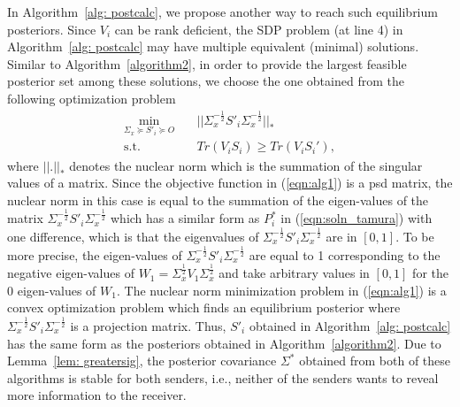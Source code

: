 \documentclass[12pt,journal,onecolumn]{IEEEtran}
\begin{document}
In Algorithm~\ref{alg: postcalc}, we propose another way to reach such equilibrium posteriors. %
Since $V_i$ can be rank deficient, the SDP problem (at line 4) in Algorithm~\ref{alg: postcalc} may have multiple equivalent (minimal) solutions.
Similar to Algorithm~\ref{algorithm2}, in order to provide the largest feasible posterior set 
among these solutions, we choose the one obtained from the following optimization problem   
\begin{align}\label{eqn:alg1}
\min_{\Sigma_x\succeq S'_{i}\succeq O} & \quad  ||\Sigma_x^{-\frac{1}{2}}S'_{i}\Sigma_x^{-\frac{1}{2}}||_* \nonumber\\
\textrm{s.t.} & \quad 
Tr(V_iS_i)\geq Tr(V_iS_i'),
\end{align}
where $||.||_*$ denotes the nuclear norm which is the summation of the singular values of a matrix. Since the objective function in (\ref{eqn:alg1}) is a psd matrix, the nuclear norm in this case is equal to the summation of the eigen-values of the matrix $ \Sigma_x^{-\frac{1}{2}}S'_{i}\Sigma_x^{-\frac{1}{2}}$ which has a similar form as $P_i^*$ in (\ref{eqn:soln_tamura}) with one difference, which is that the eigenvalues of $\Sigma_x^{-\frac{1}{2}}S'_{i}\Sigma_x^{-\frac{1}{2}}$ are in $[0,1]$. To be more precise, the eigen-values of $\Sigma_x^{-\frac{1}{2}}S'_{i}\Sigma_x^{-\frac{1}{2}}$ are equal to 1 corresponding to the negative eigen-values of $W_1=\Sigma_x^{\frac{1}{2}}V_{1}\Sigma_x^{\frac{1}{2}}$ and take arbitrary values in $[0,1]$ for the 0 eigen-values of $W_1$. The nuclear norm minimization problem in (\ref{eqn:alg1}) is a convex optimization problem \cite{recht2011simpler} which finds an equilibrium posterior where $ \Sigma_x^{-\frac{1}{2}}S'_{i}\Sigma_x^{-\frac{1}{2}}$ is a projection matrix. Thus, $S'_{i}$ obtained in Algorithm~\ref{alg: postcalc}  has the same form as the posteriors obtained in Algorithm~\ref{algorithm2}. %
Due to Lemma~\ref{lem: greatersig}, the posterior covariance $\Sigma^*$ obtained from both of these algorithms is stable for both senders, i.e., neither of the senders wants to reveal more information to the receiver. %
\end{document}

